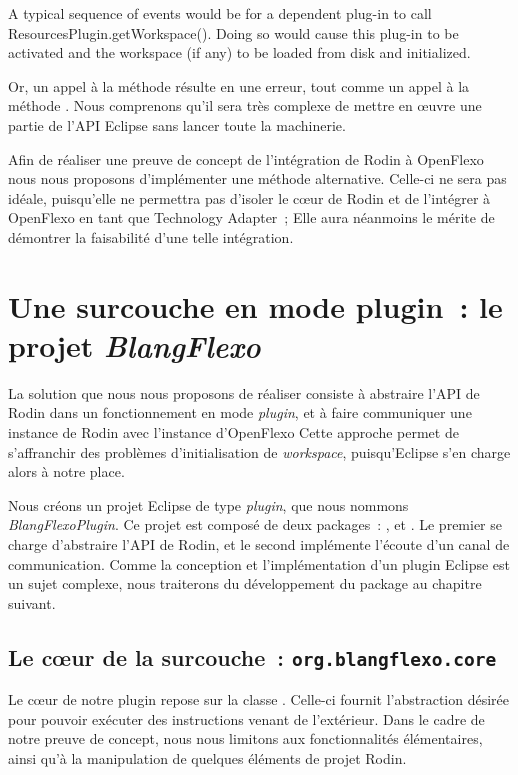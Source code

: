 \begin{imtaQuote}
A typical sequence of events would be for a dependent plug-in to call\\ResourcesPlugin.getWorkspace().
Doing so would cause this plug-in to be activated and the workspace (if any) to be loaded from disk and initialized.
\end{imtaQuote}

Or, un appel à la méthode  résulte en une erreur, tout comme un appel à la méthode .
Nous comprenons qu'il sera très complexe de mettre en œuvre une partie de l'API Eclipse sans lancer toute la machinerie.

Afin de réaliser une preuve de concept de l'intégration de Rodin à OpenFlexo nous nous proposons d'implémenter une méthode alternative.
Celle-ci ne sera pas idéale, puisqu'elle ne permettra pas d'isoler le cœur de Rodin et de l'intégrer à OpenFlexo en tant que Technology Adapter~; %
Elle aura néanmoins le mérite de démontrer la faisabilité d'une telle intégration.


\section{Une surcouche en mode plugin~: le projet \textit{BlangFlexo}}

La solution que nous nous proposons de réaliser consiste à abstraire l'API de Rodin dans un fonctionnement en mode \textit{plugin}, et à faire communiquer une instance de Rodin %
avec l'instance d'OpenFlexo
Cette approche permet de s'affranchir des problèmes d'initialisation de \textit{workspace}, puisqu'Eclipse s'en charge alors à notre place.

Nous créons un projet Eclipse de type \textit{plugin}, que nous nommons \textit{BlangFlexoPlugin}.
Ce projet est composé de deux packages~: , et .
Le premier se charge d'abstraire l'API de Rodin, et le second implémente l'écoute d'un canal de communication.
Comme la conception et l'implémentation d'un plugin Eclipse est un sujet complexe, nous traiterons du développement du package  au chapitre suivant.

\subsection{Le cœur de la surcouche~: \texttt{org.blangflexo.core}}

Le cœur de notre plugin repose sur la classe .
Celle-ci fournit l'abstraction désirée pour pouvoir exécuter des instructions venant de l'extérieur.
Dans le cadre de notre preuve de concept, nous nous limitons aux fonctionnalités élémentaires, ainsi qu'à la manipulation de quelques éléments de projet Rodin.

